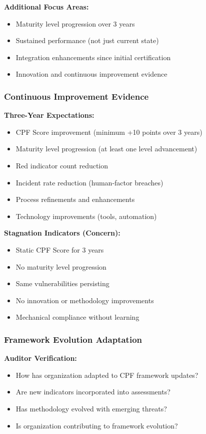\documentclass[11pt,a4paper]{article}
\begin{document}
\textbf{Additional Focus Areas:}
\begin{itemize}
\item Maturity level progression over 3 years
\item Sustained performance (not just current state)
\item Integration enhancements since initial certification
\item Innovation and continuous improvement evidence
\end{itemize}

\subsubsection{Continuous Improvement Evidence}

\textbf{Three-Year Expectations:}

\begin{itemize}
\item CPF Score improvement (minimum +10 points over 3 years)
\item Maturity level progression (at least one level advancement)
\item Red indicator count reduction
\item Incident rate reduction (human-factor breaches)
\item Process refinements and enhancements
\item Technology improvements (tools, automation)
\end{itemize}

\textbf{Stagnation Indicators (Concern):}

\begin{itemize}
\item Static CPF Score for 3 years
\item No maturity level progression
\item Same vulnerabilities persisting
\item No innovation or methodology improvements
\item Mechanical compliance without learning
\end{itemize}

\subsubsection{Framework Evolution Adaptation}

\textbf{Auditor Verification:}

\begin{itemize}
\item How has organization adapted to CPF framework updates?
\item Are new indicators incorporated into assessments?
\item Has methodology evolved with emerging threats?
\item Is organization contributing to framework evolution?
\end{itemize}
\end{document}
